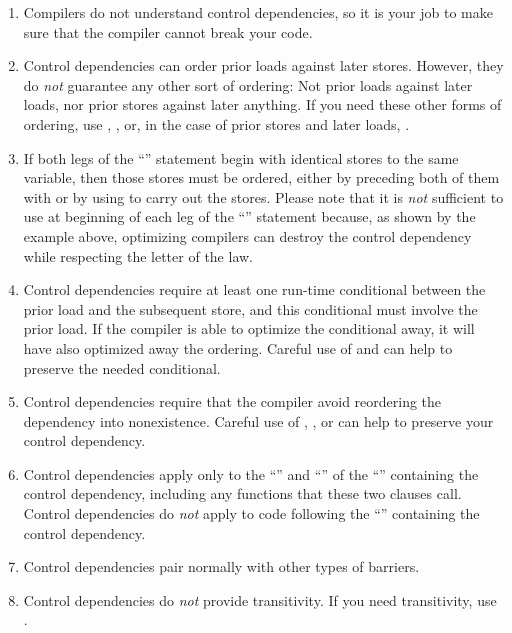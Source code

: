 \begin{enumerate}
\item	Compilers do not understand control dependencies, so it is
	your job to make sure that the compiler cannot break your code.

\item	Control dependencies can order prior loads against later stores.
	However, they do \emph{not} guarantee any other sort of ordering:
	Not prior loads against later loads, nor prior stores against
	later anything.
	If you need these other forms of ordering, use ,
	, or, in the case of prior stores and later loads,
	.

\item	If both legs of the ``'' statement begin with identical stores
	to the same variable, then those stores must be ordered,
	either by preceding both of them with  or by using
	 to carry out the stores.
	Please note that it is \emph{not} sufficient to use 
	at beginning of each leg of the ``'' statement because, as shown
	by the example above, optimizing compilers can destroy the control
	dependency while respecting the letter of the  law.

\item	Control dependencies require at least one run-time conditional
	between the prior load and the subsequent store, and this
	conditional must involve the prior load.
	If the compiler is able to optimize the conditional away, it
	will have also optimized away the ordering.
	Careful use of  and  can help
	to preserve the needed conditional.

\item	Control dependencies require that the compiler avoid reordering
	the dependency into nonexistence.
	Careful use of , , or
	 can help to preserve your control
	dependency.

\item	Control dependencies apply only to the ``'' and
	``'' of the ``'' containing the control
	dependency, including any functions that these two clauses call.
	Control dependencies do \emph{not} apply to code following the
	``'' containing the control dependency.

\item	Control dependencies pair normally with other types of barriers.

\item	Control dependencies do \emph{not} provide transitivity.
	If you need transitivity, use .
\end{enumerate}

